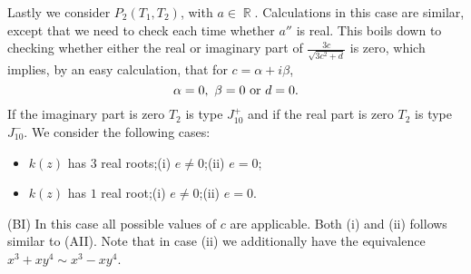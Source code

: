 \documentclass[noend]{amsproc}
\theoremstyle{definition}
\DeclareMathOperator{\R}{\mathbb{R}}
\begin{document}
Lastly we consider $P_2(T_1,T_2)$, with $a\in\R$. Calculations in this case are similar, except that we need to check each time whether $a''$ is real. This boils down to checking whether either the real or imaginary part of $\frac{3c}{\sqrt{3{c}^2+d}}$ is zero, which implies, by an easy calculation, that for 
$c=\alpha +i\beta$, 
\begin{equation}\label{eqd}
\alpha=0,\ \beta=0\textnormal{ or }d=0.
\end{equation}
If the imaginary part is zero $T_2$ is type $J_{10}^+$ and if the real part is zero $T_2$ is type $J_{10}^-$.
We consider the following cases:

\begin{itemize}
\item[(BI)]$k(z)$ has $3$ real roots;\quad (i) $e\neq 0$;\quad (ii) $e=0$;
\item[(BII)]$k(z)$ has $1$ real root;\quad (i) $e\neq 0$;\quad (ii) $e=0$.
\end{itemize}
(BI) In this case all possible values of $c$ are applicable. Both (i) and (ii) follows similar to (AII). Note that in case (ii) we additionally have the equivalence $x^3+xy^4\sim x^3-xy^4$.

%

\end{document}
